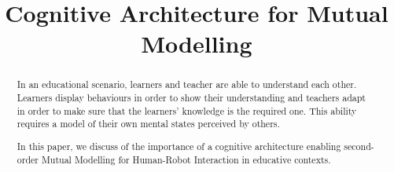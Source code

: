 \documentclass[conference]{IEEEtran}
\begin{document}
\title{Cognitive Architecture for Mutual Modelling}


\author{
}



\maketitle

\begin{abstract}
In an educational scenario, learners and teacher are able to understand each other. 
Learners display behaviours in order to show their understanding and teachers adapt in order to make sure that the learners' knowledge is the required one. 
This ability requires a model of their own mental states perceived by others.

In this paper, we discuss of the importance of a cognitive architecture enabling second-order Mutual Modelling for Human-Robot Interaction in educative contexts.


\end{abstract}





%
\IEEEpeerreviewmaketitle
\end{document}
